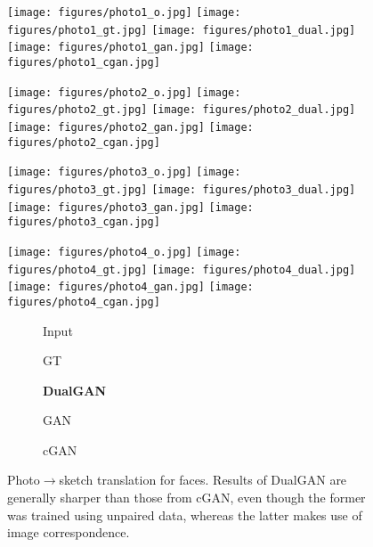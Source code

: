 \begin{figure}
\begin{center}
\texttt{[image: figures/photo1\_o.jpg]}
\texttt{[image: figures/photo1\_gt.jpg]}
\texttt{[image: figures/photo1\_dual.jpg]}
\texttt{[image: figures/photo1\_gan.jpg]}
\texttt{[image: figures/photo1\_cgan.jpg]}

\texttt{[image: figures/photo2\_o.jpg]}
\texttt{[image: figures/photo2\_gt.jpg]}
\texttt{[image: figures/photo2\_dual.jpg]}
\texttt{[image: figures/photo2\_gan.jpg]}
\texttt{[image: figures/photo2\_cgan.jpg]}

\texttt{[image: figures/photo3\_o.jpg]}
\texttt{[image: figures/photo3\_gt.jpg]}
\texttt{[image: figures/photo3\_dual.jpg]}
\texttt{[image: figures/photo3\_gan.jpg]}
\texttt{[image: figures/photo3\_cgan.jpg]}

\texttt{[image: figures/photo4\_o.jpg]}
\texttt{[image: figures/photo4\_gt.jpg]}
\texttt{[image: figures/photo4\_dual.jpg]}
\texttt{[image: figures/photo4\_gan.jpg]}
\texttt{[image: figures/photo4\_cgan.jpg]}

\begin{subfigure}[]{0.19\linewidth}\caption*{Input}\end{subfigure}
\begin{subfigure}[]{0.19\linewidth}\caption*{GT}\end{subfigure}
\begin{subfigure}[]{0.19\linewidth}\caption*{\textbf{DualGAN}}\end{subfigure}
\begin{subfigure}[]{0.19\linewidth}\caption*{GAN}\end{subfigure}
\begin{subfigure}[]{0.19\linewidth}\caption*{cGAN~\cite{isola2016image}}\end{subfigure}
\caption{Photo$\rightarrow$sketch translation for faces. Results of DualGAN are 
generally sharper than those from cGAN, even though the former was trained using 
unpaired data, whereas the latter makes use of image correspondence.}
\label{fig:photo}
\end{center}
\end{figure}

